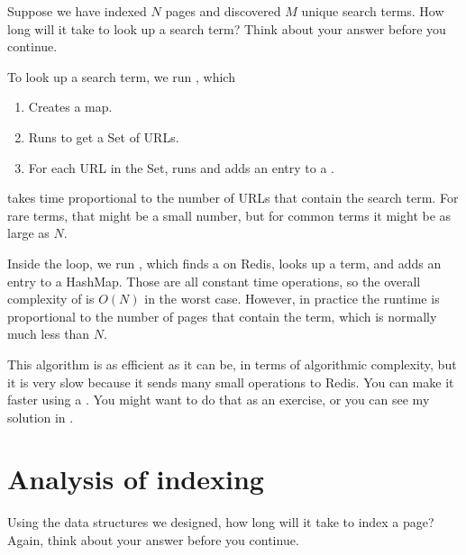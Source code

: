 \documentclass[12pt]{book}
\theoremstyle{exercise}
\begin{document}
Suppose we have indexed $N$ pages and discovered $M$
unique search terms. How long will it take to look up a search term?
Think about your answer before you continue.


To look up a search term, we run , which

\begin{enumerate}

\item
  Creates a map.

\item
  Runs  to get a Set of URLs.

\item
  For each URL in the Set, runs  and adds an entry
  to a .

\end{enumerate}

 takes time proportional to the number of URLs that
contain the search term. For rare terms, that might be a small number,
but for common terms it might be as large as $N$.

Inside the loop, we run , which finds a
 on Redis, looks up a term, and adds an entry to a
HashMap. Those are all constant time operations, so the overall
complexity of  is $O(N)$ in the worst case. However, in
practice the runtime is proportional to the number of pages that contain
the term, which is normally much less than $N$.


This algorithm is as efficient as it can be, in terms of
algorithmic complexity, but it is very slow because it sends many small
operations to Redis. You can make it faster using a
. You might want to do that as an exercise, or you
can see my solution in .



\section{Analysis of indexing}
\label{analysis-of-indexing}

Using the data structures we designed, how long will it take to index a
page? Again, think about your answer before you continue.

\end{document}
